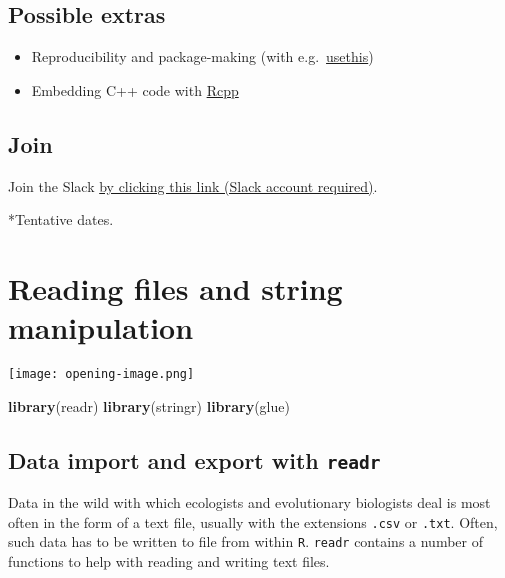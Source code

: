 \documentclass[
]{book}
\newenvironment{Shaded}{}{}
\newcommand{\KeywordTok}[1]{\textcolor[rgb]{0.00,0.44,0.13}{\textbf{#1}}}
\newcommand{\NormalTok}[1]{#1}
\providecommand{\tightlist}{%
  \setlength{\itemsep}{0pt}\setlength{\parskip}{0pt}}
\begin{document}
\hypertarget{possible-extras}{%
\section*{Possible extras}\label{possible-extras}}

\begin{itemize}
\tightlist
\item
  Reproducibility and package-making (with e.g.~\href{https://usethis.r-lib.org/}{usethis})\\
\item
  Embedding C++ code with \href{http://adv-r.had.co.nz/Rcpp.html}{Rcpp}
\end{itemize}

\hypertarget{join}{%
\section*{Join}\label{join}}

Join the Slack \href{https://join.slack.com/t/trestidytorial/shared_invite/zt-ejgr3tow-3zisGwPg1JDeTJD33DWb2A}{by clicking this link (Slack account required)}.

*Tentative dates.

\hypertarget{reading-files-and-string-manipulation}{%
\chapter{Reading files and string manipulation}\label{reading-files-and-string-manipulation}}

\texttt{[image: opening-image.png]}

\begin{Shaded}
\begin{Highlighting}[]
\KeywordTok{library}\NormalTok{(readr)}
\KeywordTok{library}\NormalTok{(stringr)}
\KeywordTok{library}\NormalTok{(glue)}
\end{Highlighting}
\end{Shaded}

\hypertarget{data-import-and-export-with-readr}{%
\section{\texorpdfstring{Data import and export with \texttt{readr}}{Data import and export with readr}}\label{data-import-and-export-with-readr}}

Data in the wild with which ecologists and evolutionary biologists deal is most often in the form of a text file, usually with the extensions \texttt{.csv} or \texttt{.txt}. Often, such data has to be written to file from within \texttt{R}. \texttt{readr} contains a number of functions to help with reading and writing text files.
\end{document}
